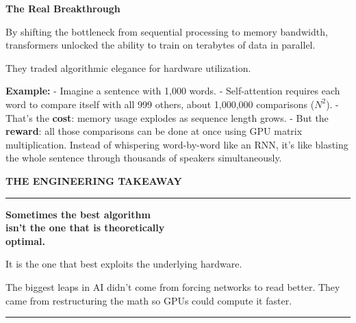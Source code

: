 \documentclass[11pt]{article}
\begin{document}
\begin{infobox}

\textbf{The Real Breakthrough}

By shifting the bottleneck from sequential processing to memory bandwidth, transformers unlocked the ability to train on terabytes of data in parallel. 

They traded algorithmic elegance for hardware utilization.

\vspace{0.15in}

\textbf{Example:}  
- Imagine a sentence with 1,000 words.  
- Self-attention requires each word to compare itself with all 999 others, about 1,000,000 comparisons ($N^2$).  
- That’s the \textbf{cost}: memory usage explodes as sequence length grows.  
- But the \textbf{reward}: all those comparisons can be done at once using GPU matrix multiplication. Instead of whispering word-by-word like an RNN, it’s like blasting the whole sentence through thousands of speakers simultaneously.  
\end{infobox}


\vfill
\newpage


\vspace*{0.35in}

\begin{center}

{\fontsize{14}{16}\selectfont\color{brandblue}\textbf{THE ENGINEERING TAKEAWAY}}

\vspace{0.3in}

\begin{minipage}{0.88\textwidth}
\centering

{\color{brandblue}\rule{6cm}{1pt}}

\vspace{0.2in}

{\fontsize{24}{28}\selectfont\bfseries\color{brandnavy}
Sometimes the best algorithm\\
isn't the one that is theoretically\\
optimal.
}

\vspace{0.15in}

{\fontsize{12}{14}\selectfont\color{brandgray}
It is the one that best exploits the underlying hardware.

\vspace{0.1in}
The biggest leaps in AI didn't come from forcing networks to read better. They came from restructuring the math so GPUs could compute it faster.
}

\vspace{0.2in}

{\color{brandblue}\rule{6cm}{1pt}}

\end{minipage}

\end{center}
\end{document}
